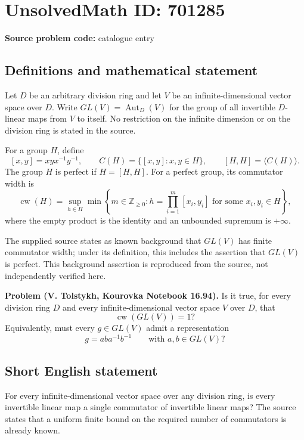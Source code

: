 \documentclass[11pt]{article}
\newcommand{\Z}{\mathbb{Z}}
\begin{document}
\section*{UnsolvedMath ID: 701285}
\textbf{Source problem code:} catalogue entry
\subsection{Definitions and mathematical statement}
Let \(D\) be an arbitrary division ring and let \(V\) be an infinite-dimensional vector space over \(D\). Write \(GL(V)=\operatorname{Aut}_D(V)\) for the group of all invertible \(D\)-linear maps from \(V\) to itself. No restriction on the infinite dimension or on the division ring is stated in the source.

For a group \(H\), define
\[
[x,y]=xyx^{-1}y^{-1},\qquad C(H)=\{[x,y]:x,y\in H\},\qquad [H,H]=\langle C(H)\rangle.
\]
The group \(H\) is perfect if \(H=[H,H]\). For a perfect group, its commutator width is
\[
\operatorname{cw}(H)=\sup_{h\in H}\min\left\{m\in\Z_{\geq 0}:h=\prod_{i=1}^{m}[x_i,y_i]\text{ for some }x_i,y_i\in H\right\},
\]
where the empty product is the identity and an unbounded supremum is \(+\infty\).

The supplied source states as known background that \(GL(V)\) has finite commutator width; under its definition, this includes the assertion that \(GL(V)\) is perfect. This background assertion is reproduced from the source, not independently verified here.

\textbf{Problem (V. Tolstykh, Kourovka Notebook 16.94).} Is it true, for every division ring \(D\) and every infinite-dimensional vector space \(V\) over \(D\), that
\[
\operatorname{cw}(GL(V))=1?
\]
Equivalently, must every \(g\in GL(V)\) admit a representation
\[
g=aba^{-1}b^{-1}\qquad\text{with }a,b\in GL(V)?
\]
\subsection{Short English statement}
For every infinite-dimensional vector space over any division ring, is every invertible linear map a single commutator of invertible linear maps? The source states that a uniform finite bound on the required number of commutators is already known.
\end{document}
